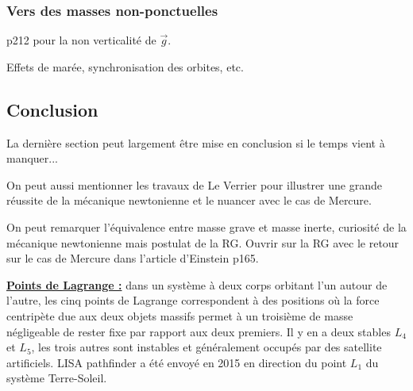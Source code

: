 \subsubsection{Vers des masses non-ponctuelles}

\cite{Sanz2016} p212 pour la non verticalité de $\overrightarrow{g}$.

Effets de marée, synchronisation des orbites, etc.

\subsection*{Conclusion}

La dernière section peut largement être mise en conclusion si le temps vient à manquer...

On peut aussi mentionner les travaux de Le Verrier pour illustrer une grande réussite de la mécanique newtonienne et le nuancer avec le cas de Mercure.

On peut remarquer l'équivalence entre masse grave et masse inerte, curiosité de la mécanique newtonienne mais postulat de la RG.
Ouvrir sur la RG avec le retour sur le cas de Mercure dans l'article d'Einstein \cite{Faroux1996} p165.

\begin{remarque}
\href{https://fr.wikipedia.org/wiki/Point_de_Lagrange}{\textbf{Points de Lagrange :}} dans un système à deux corps orbitant l'un autour de l'autre, les cinq points de Lagrange correspondent à des positions où la force centripète due aux deux objets massifs permet à un troisième de masse négligeable de rester fixe par rapport aux deux premiers.
Il y en a deux stables $L_4$ et $L_5$, les trois autres sont instables et généralement occupés par des satellite artificiels.
LISA pathfinder a été envoyé en 2015 en direction du point $L_1$ du système Terre-Soleil.
\end{remarque}

